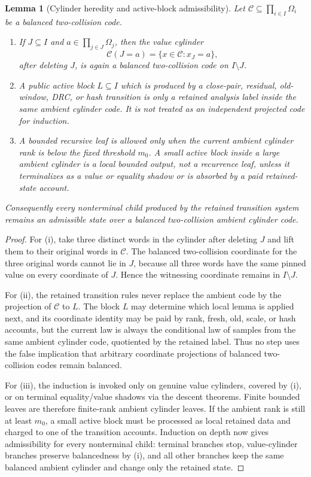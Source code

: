 \documentclass[11pt]{article}
\newtheorem{lemma}[theorem]{Lemma}
\theoremstyle{remark}
\newcommand{\C}{\mathcal C}
\begin{document}
\begin{lemma}[Cylinder heredity and active-block admissibility]\label{lem:cylinder-active-admissibility}
Let $\C\subseteq\prod_{i\in I}\Omega_i$ be a balanced two-collision code.
\begin{enumerate}[label=\textup{(\roman*)}]
\item If $J\subseteq I$ and $a\in\prod_{j\in J}\Omega_j$, then the value cylinder
\[
        \C(J=a)=\{x\in\C:x_J=a\},
\]
after deleting $J$, is again a balanced two-collision code on $I\setminus J$.
\item A public active block $L\subseteq I$ which is produced by a close-pair, residual, old-window, DRC, or hash transition is only a retained analysis label inside the same ambient cylinder code.  It is not treated as an independent projected code for induction.
\item A bounded recursive leaf is allowed only when the current ambient cylinder rank is below the fixed threshold $m_0$.  A small active block inside a large ambient cylinder is a local bounded output, not a recurrence leaf, unless it terminalizes as a value or equality shadow or is absorbed by a paid retained-state account.
\end{enumerate}
Consequently every nonterminal child produced by the retained transition system remains an admissible state over a balanced two-collision ambient cylinder code.
\end{lemma}

\begin{proof}
For (i), take three distinct words in the cylinder after deleting $J$ and lift them to their original words in $\C$.  The balanced two-collision coordinate for the three original words cannot lie in $J$, because all three words have the same pinned value on every coordinate of $J$.  Hence the witnessing coordinate remains in $I\setminus J$.

For (ii), the retained transition rules never replace the ambient code by the projection of $\C$ to $L$.  The block $L$ may determine which local lemma is applied next, and its coordinate identity may be paid by rank, fresh, old, scale, or hash accounts, but the current law is always the conditional law of samples from the same ambient cylinder code, quotiented by the retained label.  Thus no step uses the false implication that arbitrary coordinate projections of balanced two-collision codes remain balanced.

For (iii), the induction is invoked only on genuine value cylinders, covered by (i), or on terminal equality/value shadows via the descent theorems.  Finite bounded leaves are therefore finite-rank ambient cylinder leaves.  If the ambient rank is still at least $m_0$, a small active block must be processed as local retained data and charged to one of the transition accounts.  Induction on depth now gives admissibility for every nonterminal child: terminal branches stop, value-cylinder branches preserve balancedness by (i), and all other branches keep the same balanced ambient cylinder and change only the retained state.
\end{proof}
\end{document}
